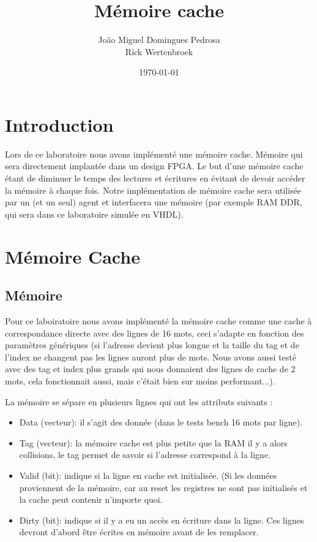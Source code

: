 \documentclass[10pt,a4paper]{article}
\author{João Miguel Domingues Pedrosa\\Rick Wertenbroek}
\title{Mémoire cache}
\date{\today}
\begin{document}
\maketitle
\newpage
\tableofcontents
\newpage

\section{Introduction}
Lors de ce laboratoire nous avons implémenté une mémoire cache. Mémoire qui sera directement implantée dans un design FPGA. Le but d'une mémoire cache étant de diminuer le temps des lectures et écritures en évitant de devoir accéder la mémoire à chaque fois. Notre implémentation de mémoire cache sera utilisée par un (et un seul) agent et interfacera une mémoire (par exemple RAM DDR, qui sera dans ce laboratoire simulée en VHDL).

\section{Mémoire Cache}
\subsection{Mémoire}
Pour ce laboiratoire nous avons implémenté la mémoire cache comme une cache à correspondance directe avec des lignes de 16 mots, ceci s'adapte en fonction des paramètres génériques (si l'adresse devient plus longue et la taille du tag et de l'index ne changent pas les lignes auront plus de mots. Nous avons aussi testé avec des tag et index plus grands qui nous donnaient des lignes de cache de 2 mots, cela fonctionnait aussi, mais c'était bien sur moins performant...).

La mémoire se sépare en plusieurs lignes qui ont les attributs suivants :

\begin{itemize}
	\item Data (vecteur): il s'agit des donnée (dans le tests bench 16 mots par ligne).
	\item Tag  (vecteur): la mémoire cache est plus petite que la RAM il y a alors collisions, le tag permet de savoir si l'adresse correspond à la ligne.
	\item Valid (bit): indique si la ligne en cache est initialisée. (Si les données proviennent de la mémoire, car au reset les registres ne sont pas initialisés et la cache peut contenir n'importe quoi.
	\item Dirty (bit): indique si il y a eu un accès en écriture dans la ligne. Ces lignes devront d'abord être écrites en mémoire avant de les remplacer.\\
\end{itemize}
\end{document}
